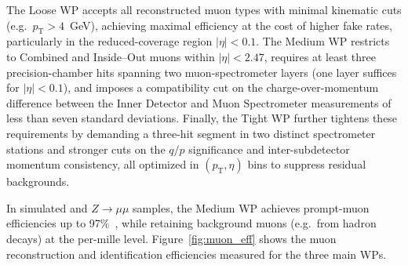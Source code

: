 The Loose WP accepts all reconstructed muon types with minimal kinematic cuts (e.g.\ $p_{\text{T}}>4$~GeV), achieving maximal efficiency at the cost of higher fake rates, particularly in the reduced-coverage region $|\eta|<0.1$. The Medium WP restricts to Combined and Inside–Out muons within $|\eta|<2.47$, requires at least three precision-chamber hits spanning two muon-spectrometer layers (one layer suffices for $|\eta|<0.1$), and imposes a compatibility cut on the charge-over-momentum difference between the Inner Detector and Muon Spectrometer measurements of less than seven standard deviations. Finally, the Tight WP further tightens these requirements by demanding a three-hit segment in two distinct spectrometer stations and stronger cuts on the $q/p$ significance and inter-subdetector momentum consistency, all optimized in $(p_{\text{T}},\eta)$ bins to suppress residual backgrounds.

In simulated \ttbar and $Z\to\mu\mu$ samples, the Medium WP achieves prompt-muon efficiencies up to 97$\%$~\cite{muon_reco_run2}, while retaining background muons (e.g.\ from hadron decays) at the per-mille level. Figure~\ref{fig:muon_eff} shows the muon reconstruction and identification efficiencies measured for the three main WPs.

